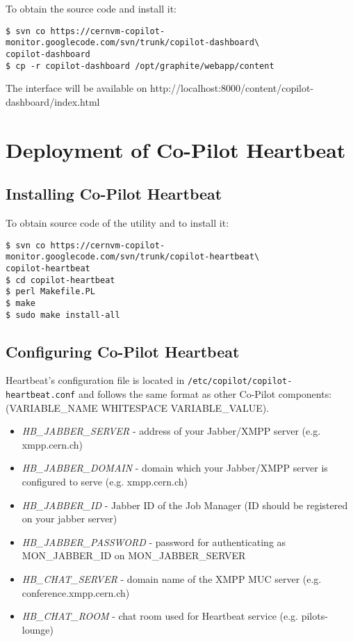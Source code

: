 To obtain the source code and install it:
\lstset{caption=Installing the Dashboard}
\begin{lstlisting}
$ svn co https://cernvm-copilot-monitor.googlecode.com/svn/trunk/copilot-dashboard\
copilot-dashboard
$ cp -r copilot-dashboard /opt/graphite/webapp/content
\end{lstlisting}

The interface will be available on http://localhost:8000/content/copilot-dashboard/index.html

\section{Deployment of Co-Pilot Heartbeat}

\subsection{Installing Co-Pilot Heartbeat}

To obtain source code of the utility and to install it:
\lstset{caption=Installing the Monitor}
\begin{lstlisting}
$ svn co https://cernvm-copilot-monitor.googlecode.com/svn/trunk/copilot-heartbeat\
copilot-heartbeat
$ cd copilot-heartbeat
$ perl Makefile.PL
$ make
$ sudo make install-all
\end{lstlisting}

\subsection{Configuring Co-Pilot Heartbeat}

Heartbeat's configuration file is located in \texttt{/etc/copilot/copilot-heartbeat.conf} and follows the same format as other Co-Pilot components: (VARIABLE\_NAME WHITESPACE VARIABLE\_VALUE).

\begin{itemize}
  \item \emph{HB\_JABBER\_SERVER} - address of your Jabber/XMPP server (e.g. xmpp.cern.ch)
  \item \emph{HB\_JABBER\_DOMAIN} - domain which your Jabber/XMPP server is configured to serve (e.g. xmpp.cern.ch)
  \item \emph{HB\_JABBER\_ID} - Jabber ID of the Job Manager (ID should be registered on your jabber server)
  \item \emph{HB\_JABBER\_PASSWORD} - password for authenticating as MON\_JABBER\_ID on MON\_JABBER\_SERVER
  \item \emph{HB\_CHAT\_SERVER} - domain name of the XMPP MUC server (e.g. conference.xmpp.cern.ch)
  \item \emph{HB\_CHAT\_ROOM} - chat room used for Heartbeat service (e.g. pilots-lounge)
\end{itemize}

